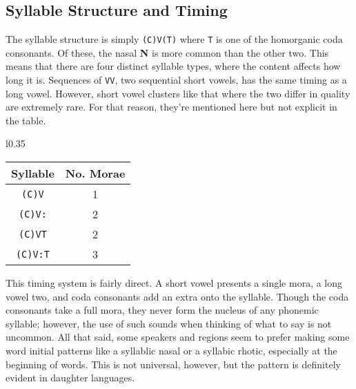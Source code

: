   \subsection{Syllable Structure and Timing}
  The syllable structure is simply \texttt{(C)V(T)} where \texttt{T} is one of the homorganic coda consonants. Of these, the nasal \textbf{N} is more common than the other two. This means that there are four distinct syllable types, where the content affects how long it is. Sequences of \texttt{VV}, two sequential short vowels, has the same timing as a long vowel. However, short vowel clusters like that where the two differ in quality are extremely rare. For that reason, they're mentioned here but not explicit in the table.
  \vertspace
  \begin{wrapfigure}{l}{0.35\textwidth}
    \begin{tabular}{|c|c|}
      \hline
      Syllable        & No. Morae \\ \hline \hline
      \texttt{(C)V}   & 1         \\
      \texttt{(C)V:}  & 2         \\
      \texttt{(C)VT}  & 2         \\ 
      \texttt{(C)V:T} & 3         \\ \hline
    \end{tabular}
  \end{wrapfigure} 
  This timing system is fairly direct. A short vowel presents a single mora, a long vowel two, and coda consonants add an extra onto the syllable. Though the coda consonants take a full mora, they never form the nucleus of any phonemic syllable; however, the use of such sounds when thinking of what to say is not uncommon. All that said, some speakers and regions seem to prefer making some word initial patterns like  a syllablic nasal or  a syllabic rhotic, especially at the beginning of words. This is not universal, however, but the pattern is definitely evident in daughter languages.\par


